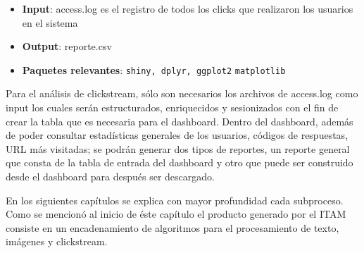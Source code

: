 \begin{itemize}
\item \textbf{Input}: access.log es el registro de todos los clicks que realizaron los usuarios en el sistema
\item \textbf{Output}: reporte.csv 
\item \textbf{Paquetes relevantes}: \texttt{shiny, dplyr, ggplot2}  \texttt{matplotlib}
\end{itemize}

Para el análisis de clickstream,  sólo son necesarios los archivos de access.log como input  los cuales  serán estructurados, enriquecidos y sesionizados con el fin de crear la tabla que es necesaria para el dashboard. Dentro del dashboard, además de poder consultar estadísticas generales de los usuarios, códigos de respuestas, URL más visitadas; se podrán generar dos tipos de reportes, un reporte general que consta de la tabla de entrada del dashboard y otro que puede ser construido desde el dashboard para después ser descargado.

En los siguientes capítulos se explica con mayor profundidad cada subproceso. Como se mencionó al inicio de éste capítulo el producto generado por el ITAM consiste en un encadenamiento de algoritmos para el procesamiento de texto, imágenes y clickstream.
